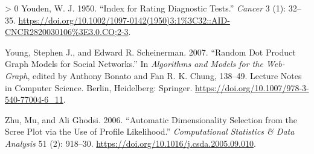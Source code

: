 \documentclass[11pt]{article}
\newlength{\cslhangindent}
\newenvironment{CSLReferences}[3] %
 {%
  \setlength{\parindent}{0pt}
  \ifodd #1 \everypar{\setlength{\hangindent}{\cslhangindent}}\ignorespaces\fi
  \ifnum #2 > 0
  \setlength{\parskip}{#2\baselineskip}
  \fi
 }%
 {}
\begin{document}
\begin{CSLReferences}{1}{0}
\leavevmode\hypertarget{ref-Youden1950IndRat}{}%
Youden, W. J. 1950. {``Index for Rating Diagnostic Tests.''}
\emph{Cancer} 3 (1): 32--35.
\url{https://doi.org/10.1002/1097-0142(1950)3:1\%3C32::AID-CNCR2820030106\%3E3.0.CO;2-3}.

\leavevmode\hypertarget{ref-Young2007RanDot}{}%
Young, Stephen J., and Edward R. Scheinerman. 2007. {``Random Dot
Product Graph Models for Social Networks.''} In \emph{Algorithms and
Models for the Web-Graph}, edited by Anthony Bonato and Fan R. K. Chung,
138--49. Lecture Notes in Computer Science. Berlin, Heidelberg:
Springer. \url{https://doi.org/10.1007/978-3-540-77004-6_11}.

\leavevmode\hypertarget{ref-Zhu2006AutDim}{}%
Zhu, Mu, and Ali Ghodsi. 2006. {``Automatic Dimensionality Selection
from the Scree Plot via the Use of Profile Likelihood.''}
\emph{Computational Statistics \& Data Analysis} 51 (2): 918--30.
\url{https://doi.org/10.1016/j.csda.2005.09.010}.

\end{CSLReferences}
\end{document}
